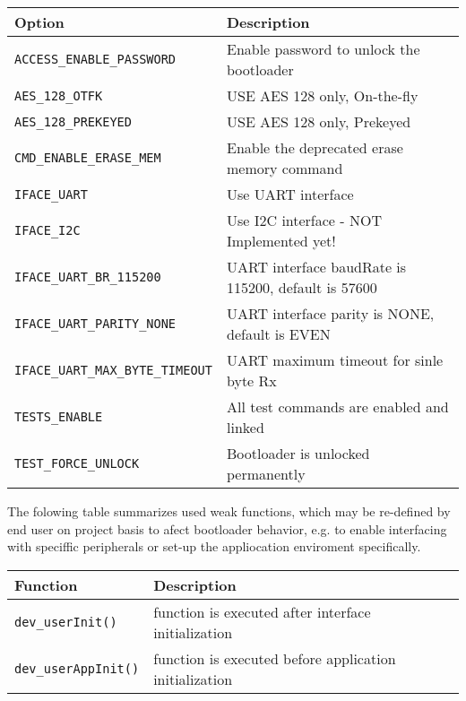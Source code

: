   \begin{table*}[!ht]
    \hspace*{-4cm}
    \begin{tabular}{| p{5.5cm} | p{7.5cm} |}
        \hline
        \rowcolor{SeaGreen3!30!} {\bf Option} & {\bf Description} \\
        \hline
        \hline
        \texttt{ACCESS\_ENABLE\_PASSWORD} & Enable password to unlock the bootloader \\
        \hline
        \texttt{AES\_128\_OTFK} & USE AES 128 only, On-the-fly \\
        \hline
        \texttt{AES\_128\_PREKEYED} & USE AES 128 only, Prekeyed \\
        \hline
        \texttt{CMD\_ENABLE\_ERASE\_MEM} & Enable the deprecated erase memory command \\
        \hline
        \texttt{IFACE\_UART} & Use UART interface\\
        \hline
        \texttt{IFACE\_I2C} & Use I2C interface - NOT Implemented yet!\\
        \hline
        \texttt{IFACE\_UART\_BR\_115200} & UART interface baudRate is 115200, default is 57600\\
        \hline
        \texttt{IFACE\_UART\_PARITY\_NONE} & UART interface parity is NONE, default is EVEN\\
        \hline
        \texttt{IFACE\_UART\_MAX\_BYTE\_TIMEOUT} & UART maximum timeout for sinle byte Rx\\
        \hline
        \texttt{TESTS\_ENABLE} & All test commands are enabled and linked\\
        \hline
        \texttt{TEST\_FORCE\_UNLOCK} & Bootloader is unlocked permanently \\
        \hline
    \end{tabular}
    \label{tab:cmdset}
   \end{table*}
   
   The folowing table summarizes used weak functions, which may be re-defined by end user on project basis to afect bootloader behavior, e.g. to enable interfacing with speciffic peripherals or set-up the appliocation enviroment specifically.
   
   \begin{table*}[!ht]
    \hspace*{-4cm}
    \begin{tabular}{| p{5.5cm} | p{7.5cm} |}
        \hline
        \rowcolor{SeaGreen3!30!} {\bf Function} & {\bf Description} \\
        \hline
        \hline
        \texttt{dev\_userInit()} & function is executed after interface initialization\\
        \hline
        \texttt{dev\_userAppInit()} & function is executed before application initialization\\
        \hline
    \end{tabular}
    \label{tab:cmdset}
   \end{table*}
   
